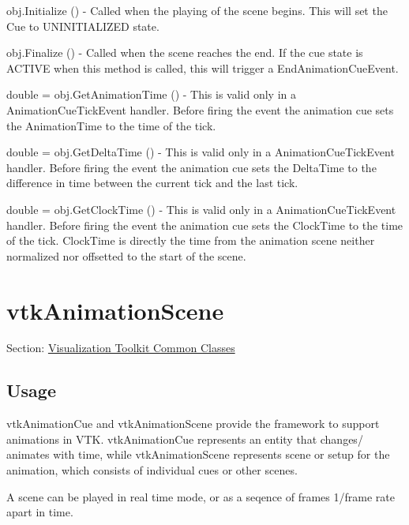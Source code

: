 \begin{DoxyItemize}
\item {\ttfamily obj.\-Initialize ()} -\/ Called when the playing of the scene begins. This will set the Cue to U\-N\-I\-N\-I\-T\-I\-A\-L\-I\-Z\-E\-D state.  
\item {\ttfamily obj.\-Finalize ()} -\/ Called when the scene reaches the end. If the cue state is A\-C\-T\-I\-V\-E when this method is called, this will trigger a End\-Animation\-Cue\-Event.  
\item {\ttfamily double = obj.\-Get\-Animation\-Time ()} -\/ This is valid only in a Animation\-Cue\-Tick\-Event handler. Before firing the event the animation cue sets the Animation\-Time to the time of the tick.  
\item {\ttfamily double = obj.\-Get\-Delta\-Time ()} -\/ This is valid only in a Animation\-Cue\-Tick\-Event handler. Before firing the event the animation cue sets the Delta\-Time to the difference in time between the current tick and the last tick.  
\item {\ttfamily double = obj.\-Get\-Clock\-Time ()} -\/ This is valid only in a Animation\-Cue\-Tick\-Event handler. Before firing the event the animation cue sets the Clock\-Time to the time of the tick. Clock\-Time is directly the time from the animation scene neither normalized nor offsetted to the start of the scene.  
\end{DoxyItemize}\hypertarget{vtkcommon_vtkanimationscene}{}\section{vtk\-Animation\-Scene}\label{vtkcommon_vtkanimationscene}
Section\-: \hyperlink{sec_vtkcommon}{Visualization Toolkit Common Classes} \hypertarget{vtkwidgets_vtkxyplotwidget_Usage}{}\subsection{Usage}\label{vtkwidgets_vtkxyplotwidget_Usage}
vtk\-Animation\-Cue and vtk\-Animation\-Scene provide the framework to support animations in V\-T\-K. vtk\-Animation\-Cue represents an entity that changes/ animates with time, while vtk\-Animation\-Scene represents scene or setup for the animation, which consists of individual cues or other scenes.

A scene can be played in real time mode, or as a seqence of frames 1/frame rate apart in time.

